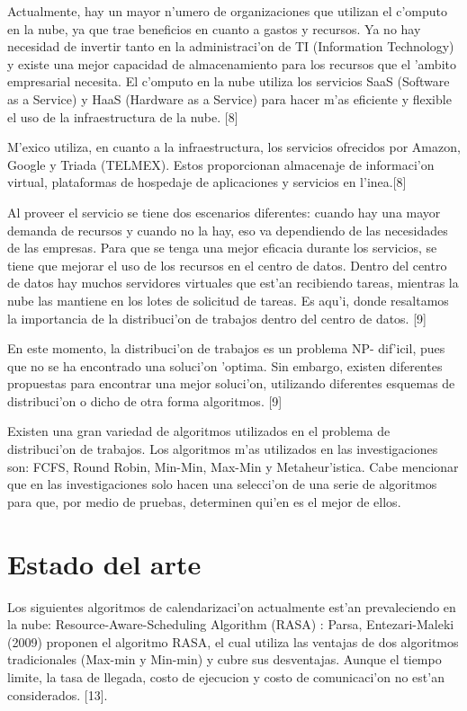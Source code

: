 Actualmente, hay un mayor n'umero de organizaciones que utilizan el c'omputo en la nube, ya que trae beneficios en cuanto a gastos y recursos. Ya no hay necesidad de invertir tanto en la administraci'on de TI (Information Technology) y existe una mejor capacidad de almacenamiento para los recursos que el 'ambito empresarial necesita.
El c'omputo en la nube utiliza los servicios SaaS (Software as a Service) y HaaS (Hardware as a Service) para hacer m'as eficiente y flexible el uso de la infraestructura de la nube. [8]

M'exico utiliza, en cuanto a la infraestructura, los servicios ofrecidos por Amazon, Google y Triada (TELMEX). Estos proporcionan almacenaje de informaci'on virtual, plataformas de hospedaje de aplicaciones y servicios en l'inea.[8] 

Al proveer el servicio se tiene dos escenarios diferentes: cuando hay una mayor demanda de recursos y cuando no la hay,  eso va dependiendo de las necesidades de las empresas. 
Para que se tenga una mejor eficacia durante los servicios, se tiene que mejorar el uso de los recursos en el centro de datos. Dentro del centro de datos hay muchos servidores virtuales que est'an recibiendo tareas, mientras la nube las mantiene en los lotes de solicitud de tareas. Es aqu'i, donde resaltamos la importancia de la distribuci'on de trabajos dentro del centro de datos. [9]

En este momento, la distribuci'on de trabajos es un problema NP- dif'icil, pues que no se ha encontrado una soluci'on 'optima. Sin embargo, existen diferentes propuestas para encontrar una mejor soluci'on, utilizando diferentes esquemas de distribuci'on o dicho de otra forma algoritmos. [9]

Existen una gran variedad de algoritmos utilizados en el problema de distribuci'on de trabajos. Los algoritmos m'as utilizados en las investigaciones son: FCFS, Round Robin, Min-Min, Max-Min y Metaheur'istica. Cabe mencionar que en las investigaciones solo hacen una selecci'on de una serie de algoritmos para que, por medio de pruebas, determinen qui'en es el mejor de ellos. 

\section*{Estado del arte}

Los siguientes algoritmos de calendarizaci'on actualmente est'an prevaleciendo en la nube:
Resource-Aware-Scheduling Algorithm (RASA) :  Parsa, Entezari-Maleki (2009) proponen el algoritmo RASA, el cual utiliza las ventajas de dos algoritmos tradicionales (Max-min y Min-min) y cubre sus desventajas. Aunque el tiempo limite, la tasa de llegada, costo de ejecucion y costo de comunicaci'on no est'an considerados. [13].

